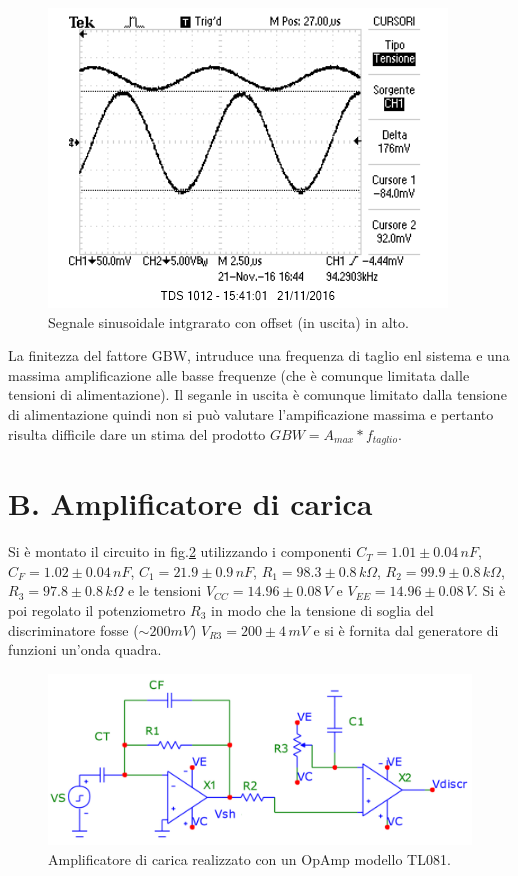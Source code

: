 \documentclass[10pt,a4paper]{article}
\begin{document}
\begin{figure}[h]
\centering
\includegraphics[scale=1.0]{immagini/sinusoidaleinAlto.png}
\caption{Segnale sinusoidale intgrarato con offset (in uscita) in alto.}
\label{senoBasso}
\end{figure}

La finitezza del fattore GBW, intruduce una frequenza di taglio enl sistema e una massima amplificazione alle basse frequenze (che è comunque limitata dalle tensioni di alimentazione). Il seganle in uscita è comunque limitato dalla tensione di alimentazione quindi non si può valutare l'ampificazione massima e pertanto risulta difficile dare un stima del prodotto $GBW = A_{max} * f_{taglio}$.

\section*{B. Amplificatore di carica}

Si è montato il circuito in fig.\ref{circuito2} utilizzando i componenti $C_T = 1.01\pm0.04 \, nF$, $C_F = 1.02 \pm 0.04 \, nF$, $C_1 = 21.9 \pm 0.9 \, nF$, $R_1 = 98.3 \pm 0.8 \, k \Omega$, $R_2 = 99.9 \pm 0.8 \, k\Omega$, $R_3 = 97.8 \pm 0.8 \, k \Omega$ e le tensioni $V_{CC} = 14.96\pm0.08 \, V$ e $V_{EE} = 14.96 \pm 0.08 \, V$. Si è poi regolato il potenziometro $R_3$ in modo che la tensione di soglia del discriminatore fosse ($\sim 200mV$) $V_{R3} = 200 \pm 4 \, mV$ e si è fornita dal generatore di funzioni un'onda quadra.\\

\begin{figure}[h]
\centering
\includegraphics[scale=0.5]{amplificatoreCarica.png}
\caption{Amplificatore di carica realizzato con un OpAmp modello TL081.\label{circuito2}}
\end{figure}
\end{document}
